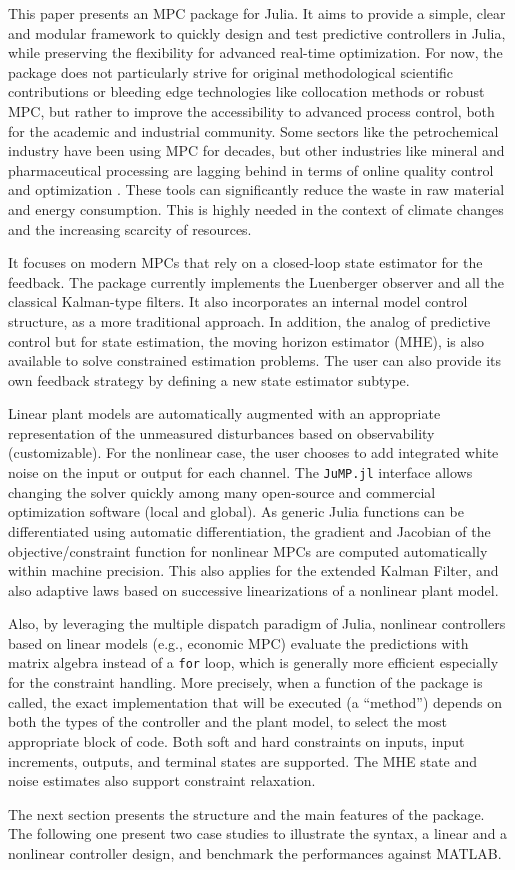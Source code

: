 This paper presents an MPC package for Julia. It aims to provide a simple, clear and modular framework to quickly design and test predictive controllers in Julia, while preserving the flexibility for advanced real-time optimization. For now, the package does not particularly strive for original methodological scientific contributions or bleeding edge technologies like collocation methods or robust MPC, but rather to improve the accessibility to advanced process control, both for the academic and industrial community. Some sectors like the petrochemical industry have been using MPC for decades, but other industries like mineral and pharmaceutical processing are lagging behind in terms of online quality control and optimization \citep{gapMPC, gapMPC2}. These tools can significantly reduce the waste in raw material and energy consumption. This is highly needed in the context of climate changes and the increasing scarcity of resources.

It focuses on modern MPCs that rely on a closed-loop state estimator for the feedback. The package currently implements the Luenberger observer and all the classical Kalman-type filters. It also incorporates an internal model control structure, as a more traditional approach. In addition, the analog of predictive control but for state estimation, the moving horizon estimator (MHE), is also available to solve constrained estimation problems. The user can also provide its own feedback strategy by defining a new state estimator subtype.

Linear plant models are automatically augmented with an appropriate representation of the unmeasured disturbances based on observability (customizable). For the nonlinear case, the user chooses to add integrated white noise on the input or output for each channel. The \texttt{JuMP.jl} interface allows changing the solver quickly among  many open-source and commercial optimization software (local and global). As generic Julia functions can be differentiated using automatic differentiation, the gradient and Jacobian of the objective/constraint function for nonlinear MPCs are computed automatically within machine precision. This also applies for the extended Kalman Filter, and also adaptive laws based on successive linearizations of a nonlinear plant model. 

Also, by leveraging the multiple dispatch paradigm of Julia, nonlinear controllers based on linear models (e.g., economic MPC) evaluate the predictions with matrix algebra instead of a \texttt{for} loop, which is generally more efficient especially for the constraint handling. More precisely, when a function of the package is called, the exact implementation that will be executed (a ``method'') depends on both the types of the controller and the plant model, to select the most appropriate block of code. Both soft and hard constraints on inputs, input increments, outputs, and terminal states are supported. The MHE state and noise estimates also support constraint relaxation.

The next section presents the structure and the main features of the package. The following one present two case studies to illustrate the syntax, a linear and a nonlinear controller design, and benchmark the performances against MATLAB.